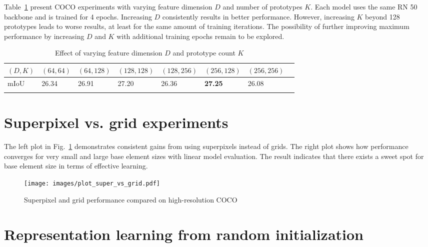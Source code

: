 \documentclass{bmvc2k}
\begin{document}
Table~\ref{tab:varying_feat_proto} present COCO experiments with varying feature dimension $D$ and number of prototypes $K$. Each model uses the same RN 50 backbone and is trained for 4 epochs. Increasing $D$ consistently results in better performance. However, increasing $K$ beyond 128 prototypes leads to worse results, at least for the same amount of training iterations. The possibility of further improving maximum performance by increasing $D$ and $K$ with additional training epochs remain to be explored.

\setlength{\tabcolsep}{4pt}
\begin{table}
\begin{center}
\caption{Effect of varying feature dimension $D$ and prototype count $K$}
\begin{tabular}{llllllll}
\hline\noalign{\smallskip}
$(D, K)$ & $(64, 64)$ & $(64, 128)$ & $(128, 128)$ & $(128, 256)$ & $(256, 128)$ & $(256, 256)$\\ \hline
\noalign{\smallskip}
mIoU & 26.34 & 26.91 & 27.20 & 26.36 & \textbf{27.25} & 26.08 \\ \hline
\label{tab:varying_feat_proto}
\end{tabular}
\end{center}
\end{table}
\setlength{\tabcolsep}{1.4pt}


\section{Superpixel vs. grid experiments}

The left plot in Fig.~\ref{fig:super_vs_grid} demonstrates consistent gains from using superpixels instead of grids. The right plot shows how performance converges for very small and large base element sizes with linear model evaluation. The result indicates that there exists a sweet spot for base element size in terms of effective learning.

\begin{figure}
\centering
\texttt{[image: images/plot\_super\_vs\_grid.pdf]}
\caption{Superpixel and grid performance compared on high-resolution COCO}
\label{fig:super_vs_grid}
\end{figure}


\section{Representation learning from random initialization}
\end{document}
